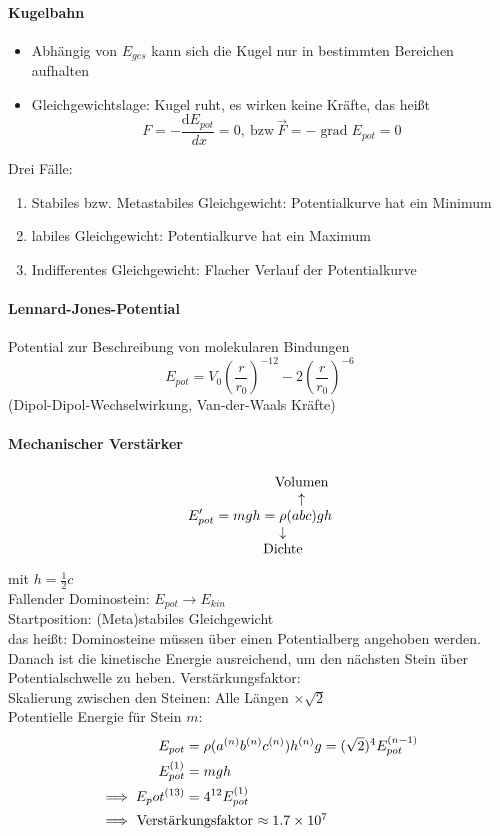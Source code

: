 \documentclass[a4paper]{scrartcl}
\DeclareMathOperator{\grad}{grad}
\renewcommand{\d}{\mathrm{d}}
\renewcommand{\v}[1]{\vec{#1}}
\newcommand{\dd}[2]{\frac{\d #1}{\ d#2}}
\theoremstyle{definition}
\theoremstyle{plain}
\theoremstyle{plain}
\theoremstyle{remark}
\theoremstyle{remark}
\theoremstyle{remark}
\begin{document}
\paragraph{Kugelbahn}
\label{sec-5-1-3-1}
\begin{itemize}
\item Abhängig von $E_{ges}$ kann sich die Kugel nur in bestimmten Bereichen aufhalten
\item Gleichgewichtslage: Kugel ruht, es wirken keine Kräfte, das heißt
\[F = -\dd{E_{pot}}{x} = 0, ~\text{bzw}~ \v F = -\grad E_{pot} = 0\]
\end{itemize}

Drei Fälle:
\begin{enumerate}
\item Stabiles bzw. Metastabiles Gleichgewicht: Potentialkurve hat ein Minimum
\item labiles Gleichgewicht: Potentialkurve hat ein Maximum
\item Indifferentes Gleichgewicht: Flacher Verlauf der Potentialkurve
\end{enumerate}
\paragraph{Lennard-Jones-Potential}
\label{sec-5-1-3-2}
Potential zur Beschreibung von molekularen Bindungen
\[E_{pot} = V_0 (\frac{r}{r_0})^{-12} - 2(\frac{r}{r_0})^{-6}\]
(Dipol-Dipol-Wechselwirkung, Van-der-Waals Kräfte)
\paragraph{Mechanischer Verstärker}
\label{sec-5-1-3-3}
\[E_{pot}' = m g h = \underarrow[\rho]{Dichte} \overarrow[(a b c)]{Volumen} g h\]
mit $h = \frac{1}{2}c$ \\
         Fallender Dominostein: $E_{pot}  \to E_{kin}$ \\
         Startposition: (Meta)stabiles Gleichgewicht \\
         das heißt: Dominosteine müssen über einen Potentialberg angehoben werden. Danach ist die kinetische Energie
ausreichend, um den nächsten Stein über Potentialschwelle zu heben.
Verstärkungsfaktor: \\
         Skalierung zwischen den Steinen: Alle Längen $\times \sqrt{2}$ \\
         Potentielle Energie für Stein $m$:
\begin{align*}
E_{pot} &= \rho(a^{(n)}b^{(n)}c^{(n)}) h^{(n)} g = (\sqrt{2})^4 E_{pot}^{(n-1)} \\
E_{pot}^{(1)} &= m g h \\
\implies E_pot^{(13)} &= 4^{12} E_{pot}^{(1)} \\
\intertext{$\implies$ Verstärkungsfaktor $\approx \SI{1.7e7}{}$}
\end{align*}
\end{document}
